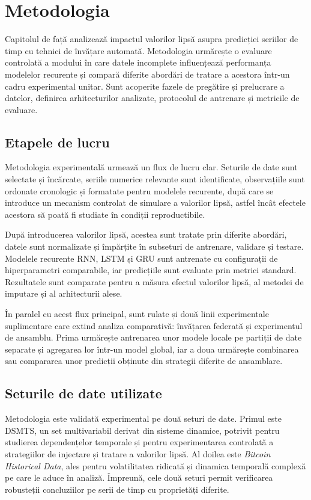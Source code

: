 \chapter{Metodologia}

Capitolul de față analizează impactul valorilor lipsă asupra predicției seriilor de timp cu tehnici de învățare automată. Metodologia urmărește o evaluare controlată a modului în care datele incomplete influențează performanța modelelor recurente și compară diferite abordări de tratare a acestora într-un cadru experimental unitar. Sunt acoperite fazele de pregătire și prelucrare a datelor, definirea arhitecturilor analizate, protocolul de antrenare și metricile de evaluare.

\section{Etapele de lucru}

Metodologia experimentală urmează un flux de lucru clar. Seturile de date sunt selectate și încărcate, seriile numerice relevante sunt identificate, observațiile sunt ordonate cronologic și formatate pentru modelele recurente, după care se introduce un mecanism controlat de simulare a valorilor lipsă, astfel încât efectele acestora să poată fi studiate în condiții reproductibile.

După introducerea valorilor lipsă, acestea sunt tratate prin diferite abordări, datele sunt normalizate și împărțite în subseturi de antrenare, validare și testare. Modelele recurente RNN, LSTM și GRU sunt antrenate cu configurații de hiperparametri comparabile, iar predicțiile sunt evaluate prin metrici standard. Rezultatele sunt comparate pentru a măsura efectul valorilor lipsă, al metodei de imputare și al arhitecturii alese.

În paralel cu acest flux principal, sunt rulate și două linii experimentale suplimentare care extind analiza comparativă: învățarea federată și experimentul de ansamblu. Prima urmărește antrenarea unor modele locale pe partiții de date separate și agregarea lor într-un model global, iar a doua urmărește combinarea sau compararea unor predicții obținute din strategii diferite de ansamblare.

\section{Seturile de date utilizate}

Metodologia este validată experimental pe două seturi de date. Primul este DSMTS, un set multivariabil derivat din sisteme dinamice, potrivit pentru studierea dependențelor temporale și pentru experimentarea controlată a strategiilor de injectare și tratare a valorilor lipsă. Al doilea este \textit{Bitcoin Historical Data}, ales pentru volatilitatea ridicată și dinamica temporală complexă pe care le aduce în analiză. Împreună, cele două seturi permit verificarea robusteții concluziilor pe serii de timp cu proprietăți diferite.

